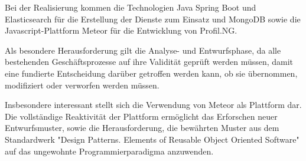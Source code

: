 Bei der Realisierung kommen die Technologien Java Spring Boot \cite{spring-boot}
und Elasticsearch \cite{elasticsearch} für die Erstellung der Dienste zum
Einsatz und MongoDB \cite{mongodb} sowie die Javascript-Plattform Meteor
\cite{meteor} für die Entwicklung von Profil.NG.

Als besondere Herausforderung gilt die Analyse- und Entwurfsphase, da alle
bestehenden Geschäftsprozesse auf ihre Validität geprüft werden müssen, damit
eine fundierte Entscheidung darüber getroffen werden kann, ob sie übernommen,
modifiziert oder verworfen werden müssen.

Insbesondere interessant stellt sich die Verwendung von Meteor als Plattform
dar. Die vollständige Reaktivität der Plattform ermöglicht das Erforschen neuer
Entwurfsmuster, sowie die Herausforderung, die bewährten Muster aus dem
Standardwerk "Design Patterns. Elements of Reusable Object Oriented Software"
\cite{design-patterns} auf das ungewohnte Programmierparadigma anzuwenden.
